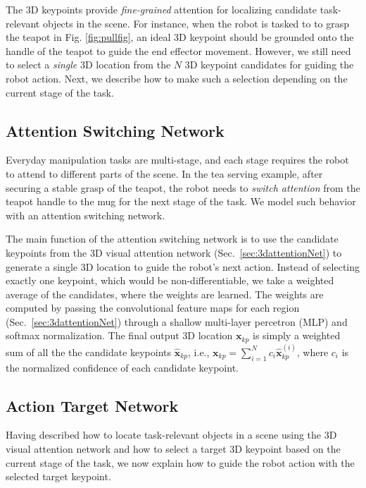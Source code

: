 \documentclass[letterpaper, 10 pt, conference]{ieeeconf}
\begin{document}
The 3D keypoints provide \textit{fine-grained} attention for localizing candidate task-relevant objects in the scene. For instance, when the robot is tasked to to grasp the teapot in Fig. \ref{fig:pullfig}, an ideal 3D keypoint should be grounded onto the handle of the teapot to guide the end effector movement. However, we still need to select a \emph{single} 3D location from the $N$ 3D keypoint candidates for guiding the robot action. Next, we describe how to make such a selection depending on the current stage of the task.


\subsection{Attention Switching Network}
\label{Sec:attention}

Everyday manipulation tasks are multi-stage, and each stage requires the robot to attend to different parts of the scene. In the tea serving example, after securing a stable grasp of the teapot, the robot needs to \emph{switch attention} from the teapot handle to the mug for the next stage of the task. We model such behavior with an attention switching network.

The main function of the attention switching network is to use the candidate keypoints from the 3D visual attention network (Sec.~\ref{sec:3dattentionNet}) to generate a single 3D location to guide the robot's next action. Instead of selecting exactly one keypoint, which would be non-differentiable, we take a weighted average of the candidates, where the weights are learned. 
The weights are computed by passing the convolutional feature maps for each region (Sec.~\ref{sec:3dattentionNet}) through a shallow multi-layer percetron (MLP) and softmax normalization.
The final output 3D location $\mathbf{x}_{kp}$ is simply a weighted sum of all the the candidate keypoints $\hat{\mathbf{x}}_{kp}$, i.e., $\mathbf{x}_{kp} = \sum_{i=1}^N c_i \hat{\mathbf{x}}_{kp}^{(i)}$, where $c_i$ is the normalized confidence of each candidate keypoint. 

\subsection{Action Target Network}
\label{Sec:goalgrounding}

Having described how to locate task-relevant objects in a scene using the 3D visual attention network and how to select a target 3D keypoint based on the current stage of the task, we now explain how to guide the robot action with the selected target keypoint.
\end{document}
